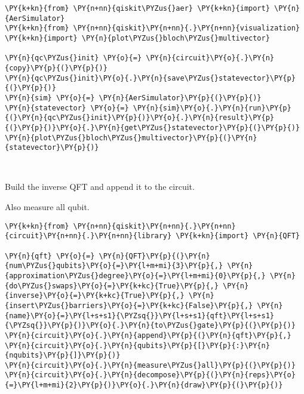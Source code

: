     \begin{tcolorbox}[breakable, size=fbox, boxrule=1pt, pad at break*=1mm,colback=cellbackground, colframe=cellborder]
\begin{Verbatim}[commandchars=\\\{\}]
\PY{k+kn}{from} \PY{n+nn}{qiskit\PYZus{}aer} \PY{k+kn}{import} \PY{n}{AerSimulator}
\PY{k+kn}{from} \PY{n+nn}{qiskit}\PY{n+nn}{.}\PY{n+nn}{visualization} \PY{k+kn}{import} \PY{n}{plot\PYZus{}bloch\PYZus{}multivector}

\PY{n}{qc\PYZus{}init} \PY{o}{=} \PY{n}{circuit}\PY{o}{.}\PY{n}{copy}\PY{p}{(}\PY{p}{)}
\PY{n}{qc\PYZus{}init}\PY{o}{.}\PY{n}{save\PYZus{}statevector}\PY{p}{(}\PY{p}{)}
\PY{n}{sim} \PY{o}{=} \PY{n}{AerSimulator}\PY{p}{(}\PY{p}{)}
\PY{n}{statevector} \PY{o}{=} \PY{n}{sim}\PY{o}{.}\PY{n}{run}\PY{p}{(}\PY{n}{qc\PYZus{}init}\PY{p}{)}\PY{o}{.}\PY{n}{result}\PY{p}{(}\PY{p}{)}\PY{o}{.}\PY{n}{get\PYZus{}statevector}\PY{p}{(}\PY{p}{)}
\PY{n}{plot\PYZus{}bloch\PYZus{}multivector}\PY{p}{(}\PY{n}{statevector}\PY{p}{)}
\end{Verbatim}
\end{tcolorbox}
 
            
    
    \begin{center}
    \end{center}
    { \hspace*{\fill} \\}
    

    Build the inverse QFT and append it to the circuit.

Also measure all qubit.

    \begin{tcolorbox}[breakable, size=fbox, boxrule=1pt, pad at break*=1mm,colback=cellbackground, colframe=cellborder]
\begin{Verbatim}[commandchars=\\\{\}]
\PY{k+kn}{from} \PY{n+nn}{qiskit}\PY{n+nn}{.}\PY{n+nn}{circuit}\PY{n+nn}{.}\PY{n+nn}{library} \PY{k+kn}{import} \PY{n}{QFT}

\PY{n}{qft} \PY{o}{=} \PY{n}{QFT}\PY{p}{(}\PY{n}{num\PYZus{}qubits}\PY{o}{=}\PY{l+m+mi}{3}\PY{p}{,} \PY{n}{approximation\PYZus{}degree}\PY{o}{=}\PY{l+m+mi}{0}\PY{p}{,} \PY{n}{do\PYZus{}swaps}\PY{o}{=}\PY{k+kc}{True}\PY{p}{,} \PY{n}{inverse}\PY{o}{=}\PY{k+kc}{True}\PY{p}{,} \PY{n}{insert\PYZus{}barriers}\PY{o}{=}\PY{k+kc}{False}\PY{p}{,} \PY{n}{name}\PY{o}{=}\PY{l+s+s1}{\PYZsq{}}\PY{l+s+s1}{qft}\PY{l+s+s1}{\PYZsq{}}\PY{p}{)}\PY{o}{.}\PY{n}{to\PYZus{}gate}\PY{p}{(}\PY{p}{)}
\PY{n}{circuit}\PY{o}{.}\PY{n}{append}\PY{p}{(}\PY{n}{qft}\PY{p}{,} \PY{n}{circuit}\PY{o}{.}\PY{n}{qubits}\PY{p}{[}\PY{p}{:}\PY{n}{nqubits}\PY{p}{]}\PY{p}{)}
\PY{n}{circuit}\PY{o}{.}\PY{n}{measure\PYZus{}all}\PY{p}{(}\PY{p}{)}
\PY{n}{circuit}\PY{o}{.}\PY{n}{decompose}\PY{p}{(}\PY{n}{reps}\PY{o}{=}\PY{l+m+mi}{2}\PY{p}{)}\PY{o}{.}\PY{n}{draw}\PY{p}{(}\PY{p}{)}
\end{Verbatim}
\end{tcolorbox}
 
